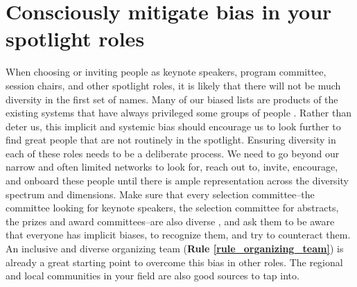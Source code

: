 \documentclass[10pt,letterpaper]{article}
\begin{document}

\section{Consciously mitigate bias in your spotlight roles}
\label{rule_unbias}

When choosing or inviting people as keynote speakers, program committee, session chairs, and other spotlight roles, it is likely that there will not be much diversity in the first set of names. 
Many of our biased lists are products of the existing systems that have always privileged some groups of people \cite{dwyerNoticeWhoScience2021,swartzScienceValueDiversity2019,wongBuildDiversityScience2020,dignazioUnicornsJanitorsNinjas2020}. 
Rather than deter us, this implicit and systemic bias should encourage us to look further to find great people that are not routinely in the spotlight. 
Ensuring diversity in each of these roles needs to be a deliberate process. 
We need to go beyond our narrow and often limited networks to look for, reach out to, invite, encourage, and onboard these people until there is ample representation across the diversity spectrum and dimensions. 
Make sure that every selection committee--the committee looking for keynote speakers, the selection committee for abstracts, the prizes and award committees--are also diverse \cite{swartzScienceValueDiversity2019, wongBuildDiversityScience2020}, and ask them to be aware that everyone has implicit biases, to recognize them, and try to counteract them. 
An inclusive and diverse organizing team (\textbf{Rule \ref{rule_organizing_team}}) is already a great starting point to overcome this bias in other roles. The regional and local communities in your field are also good sources to tap into. 
\end{document}
